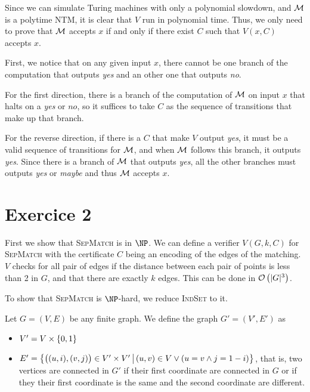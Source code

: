     Since we can simulate Turing machines with only a polynomial slowdown,
    and $\mathcal{M}$ is a polytime NTM, 
    it is clear that $V$ run in polynomial time.
    Thus, we only need to prove that $\mathcal{M}$ accepts $x$ if and only if there exist $C$
    such that $V(x, C)$ accepts $x$. 

    First, we notice that on any given input $x$, there cannot be one branch 
    of the computation that outputs \textit{yes} and an other one that outputs \textit{no}.
    
    For the first direction, there is a branch of the computation of 
    $\mathcal{M}$ on input $x$ that halts on a \textit{yes} or $\textit{no}$,
    so it suffices to take $C$ as the sequence of transitions
    that make up that branch.

    For the reverse direction, if there is a $C$ that make $V$ output \textit{yes},
    it must be a valid sequence of transitions for $\mathcal{M}$, 
    and when $\mathcal{M}$ follows this branch, it outputs \textit{yes}.
    Since there is a branch of $\mathcal{M}$ that outputs \textit{yes},
    all the other branches must outputs \textit{yes} or \textit{maybe}
    and thus $\mathcal{M}$ accepts $x$.


    \section*{Exercice 2}

    First we show that \textsc{SepMatch} is in $\NP$.
    We can define a verifier $V(G, k, C)$ 
    for \textsc{SepMatch} with the certificate $C$ being
    an encoding of the edges of the matching.
    $V$ checks for all pair of edges if the distance
    between each pair of points is less than 2 in $G$, 
    and that there are exactly $k$ edges. This can be done
    in $\mathcal{O}\left(|G|^3\right)$.

    To show that \textsc{SepMatch} is $\NP$-hard,
    we reduce \textsc{IndSet} to it.

    Let $G = (V, E)$ be any finite graph. We define the graph $G' = (V', E')$
    as \begin{itemize}
        \item $V' = V \times \left\{ 0, 1 \right\}$
        \item $E' = \left\{ 
            \big((u, i), (v, j)\big) \in V' \times V'
         \, \middle| \, 
            (u, v) \in V \vee (u = v \wedge j = 1 - i)
         \right\}$, that is, two vertices are connected in $G'$
        if their first coordinate are connected in $G$
        or if they their first coordinate is the same and the second coordinate
        are different.
    \end{itemize}

